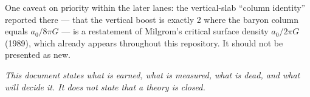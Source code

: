 \documentclass[
  11pt,
]{article}
\begin{document}
One caveat on priority within the later lanes: the vertical-slab
``column identity'' reported there --- that the vertical boost is
exactly 2 where the baryon column equals \(a_0/8\pi G\) --- is a
restatement of Milgrom's critical surface density \(a_0/2\pi G\) (1989),
which already appears throughout this repository. It should not be
presented as new.

\emph{This document states what is earned, what is measured, what is
dead, and what will decide it. It does not state that a theory is
closed.}
\end{document}

